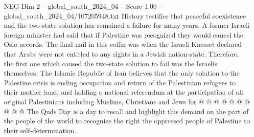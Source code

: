 \begin{textsample}{NEG Dim 2 – global\_south\_2024\_04 – Score 1.00 – global\_south\_2024\_04/107205948.txt}
History testifies that peaceful coexistence and the two-state solution has remained a failure for many years.
A former Israeli foreign minister had said that if Palestine was recognized they would cancel the Oslo accords.
The final nail in this coffin was when the Israeli Knesset declared that Arabs were not entitled to any rights in a Jewish nation-state.
Therefore, the first one which caused the two-state solution to fail was the Israelis themselves.
The Islamic Republic of Iran believes that the only solution to the Palestine crisis is ending occupation and return of the Palestinian refugees to their mother land, and holding a national referendum at the participation of all original Palestinians including Muslims, Christians and Jews for @ @ @ @ @ @ @ @ @ @ The Quds Day is a day to recall and highlight this demand on the part of the people of the world to recognize the right the oppressed people of Palestine to their self-determination.

\end{textsample}
